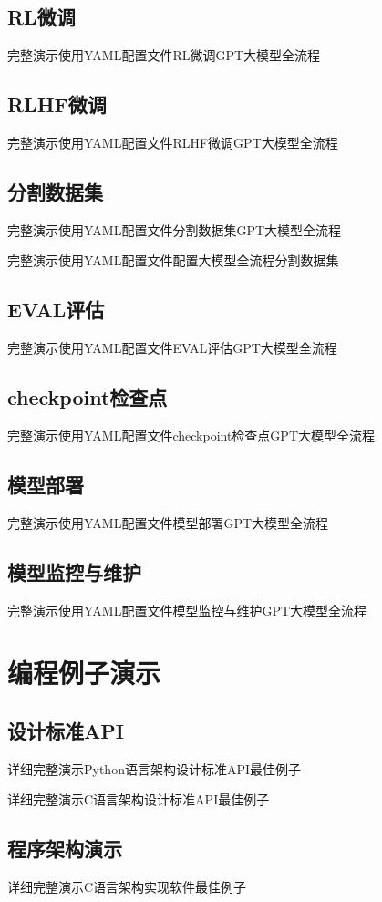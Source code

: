 \documentclass[12pt]{book}
\begin{document}
\subsection{RL微调}
完整演示使用YAML配置文件RL微调GPT大模型全流程

\subsection{RLHF微调}
完整演示使用YAML配置文件RLHF微调GPT大模型全流程

\subsection{分割数据集}
完整演示使用YAML配置文件分割数据集GPT大模型全流程

完整演示使用YAML配置文件配置大模型全流程分割数据集

\subsection{EVAL评估}
完整演示使用YAML配置文件EVAL评估GPT大模型全流程



\subsection{checkpoint检查点}
完整演示使用YAML配置文件checkpoint检查点GPT大模型全流程

\subsection{模型部署}
完整演示使用YAML配置文件模型部署GPT大模型全流程


\subsection{模型监控与维护}
完整演示使用YAML配置文件模型监控与维护GPT大模型全流程

\section{编程例子演示}
\subsection{设计标准API}
详细完整演示Python语言架构设计标准API最佳例子

详细完整演示C语言架构设计标准API最佳例子


\subsection{程序架构演示}
详细完整演示C语言架构实现软件最佳例子
\end{document}
